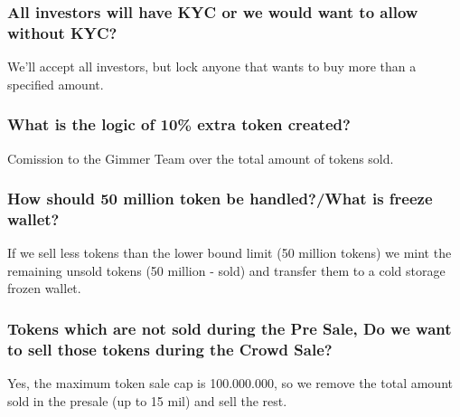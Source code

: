 \documentclass[11pt]{article} %
\begin{document}
\subsubsection{All investors will have KYC or we would want to allow without KYC?}
We'll accept all investors, but lock anyone that wants to buy more than a specified amount.\\

\subsubsection{What is the logic of 10\% extra token created?}
Comission to the Gimmer Team over the total amount of tokens sold.

\subsubsection{How should 50 million token be handled?/What is freeze wallet?}
If we sell less tokens than the lower bound limit (50 million tokens) we mint the remaining unsold tokens (50 million - sold) and transfer them to a cold storage frozen wallet.\\

\subsubsection{Tokens which are not sold during the Pre Sale, Do we want to sell those tokens during the Crowd Sale?}
Yes, the maximum token sale cap is 100.000.000, so we remove the total amount sold in the presale (up to 15 mil) and sell the rest.
\end{document}
